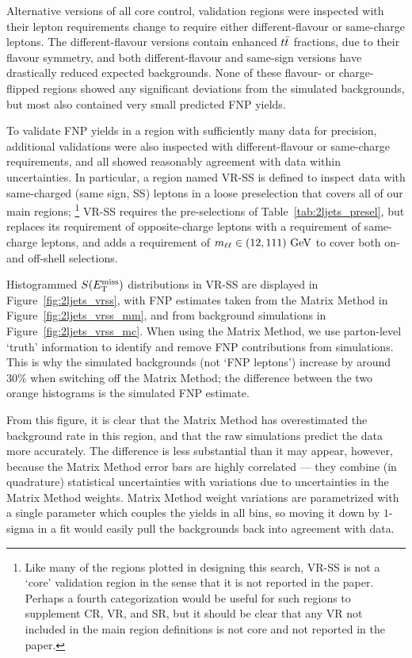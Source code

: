 Alternative versions of all core control, validation regions were inspected
with their lepton requirements change to require either different-flavour
or same-charge leptons.
The different-flavour versions contain enhanced $\ttbar$ fractions,
due to their flavour symmetry,
and both different-flavour and same-sign versions have drastically reduced
expected backgrounds.
None of these flavour- or charge- flipped regions showed any significant
deviations from the simulated backgrounds, but most also contained very small
predicted FNP yields.

To validate FNP yields in a region with sufficiently many data for precision,
additional validations were also inspected with different-flavour or
same-charge requirements, and all showed reasonably agreement with data
within uncertainties.
In particular, a region named VR-SS is defined to inspect data with
same-charged (same sign, SS) leptons in a loose preselection that covers all
of our main regions;%
\footnote{%
Like many of the regions plotted in designing this search, VR-SS is not a
`core' validation region in the sense that it is not reported in the paper.
Perhaps a fourth categorization would be useful for such regions to supplement
CR, VR, and SR, but it should be clear that any VR not included in the main
region definitions is not core and not reported in the paper.
}
VR-SS requires the pre-selections of Table~\ref{tab:2ljets_presel},
but replaces its requirement of opposite-charge leptons with a requirement of
same-charge leptons, and adds a requirement of $\mll \in (12, 111)~\eV[G]$
to cover both on- and off-shell selections.

Histogrammed $\metsig$ distributions in VR-SS are displayed in
Figure~\ref{fig:2ljets_vrss},
with FNP estimates taken from the Matrix Method in
Figure~\ref{fig:2ljets_vrss_mm},
and from background simulations in
Figure~\ref{fig:2ljets_vrss_mc}.
When using the Matrix Method, we use parton-level `truth' information to
identify and remove FNP contributions from simulations.
This is why the simulated backgrounds (not `FNP leptons') increase by around
$30\%$ when switching off the Matrix Method; the difference between the
two orange histograms is the simulated FNP estimate.

From this figure, it is clear that the Matrix Method has overestimated
the background rate in this region, and that the raw simulations predict
the data more accurately.
The difference is less substantial than it may appear, however,
because the Matrix Method error bars are highly correlated --- they combine
(in quadrature)
statistical uncertainties with variations due to uncertainties in the
Matrix Method weights.
Matrix Method weight variations are parametrized with a single parameter
which couples the yields in all bins, so moving it down by $1$-sigma in a fit
would easily pull the backgrounds back into agreement with data.

